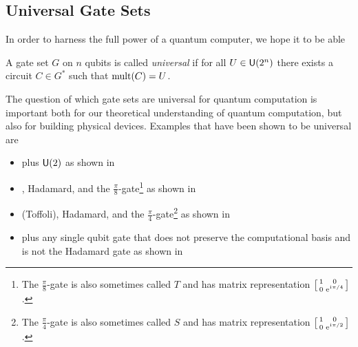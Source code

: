 \subsection{Universal Gate Sets}
In order to harness the full power of a quantum computer, we hope it to be able
\begin{definition}
    A gate set $G$ on $n$ qubits is called \emph{universal} if for all $U\in\mathsf{U} (2^n)$ there exists a circuit $C\in G^*$ such that $\operatorname{mult}(C) = U$.
\end{definition}

The question of which gate sets are universal for quantum computation is important both for our theoretical understanding of quantum computation, but also for building physical devices.
Examples that have been shown to be universal are
\begin{itemize}
    \item \CNOT{} plus $\mathsf{U} (2)$ as shown in~\cite{universal-cnot-u2}
    \item \CNOT{}, Hadamard, and the $\frac{\pi}{8}$-gate\footnote{The $\frac{\pi}{8}$-gate is also sometimes called $T$ and has matrix representation $\smqty[1 & 0 \\ 0 & \e^{\iu\pi/4}]$.} as shown in~\cite{universal-cnot-had-p8}
    \item \CCNOT{} (Toffoli), Hadamard, and the $\frac{\pi}{4}$-gate\footnote{The $\frac{\pi}{4}$-gate is also sometimes called $S$ and has matrix representation $\smqty[1 & 0 \\ 0 & \e^{\iu\pi/2}]$.} as shown in~\cite{universal-ccnot-had-p4}
    \item \CNOT{} plus any single qubit gate that does not preserve the computational basis and is not the Hadamard gate as shown in~\cite{universal-cnot-basis-change}
\end{itemize}
